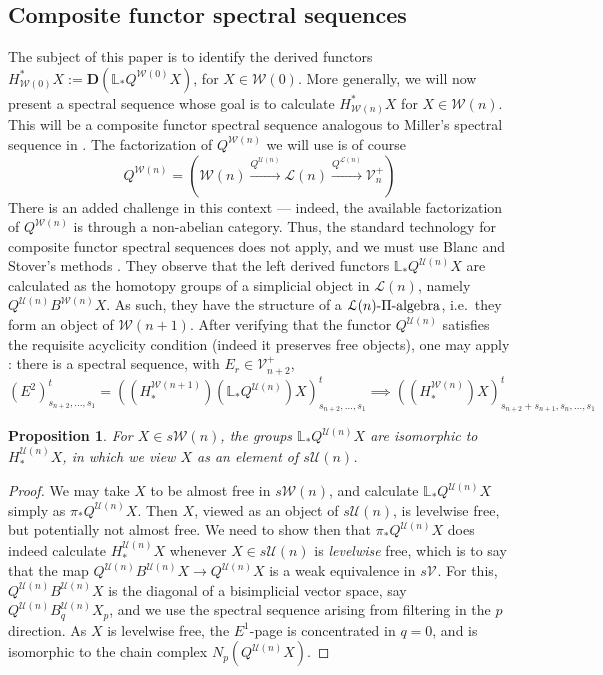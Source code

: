 \documentclass[11pt]{amsart}
\theoremstyle{plain}
\newtheorem{prop}[thm]{Proposition}
\theoremstyle{definition}
\renewcommand{\to}{\longrightarrow}
\newcommand{\calU}{\mathcal{U}}
\newcommand{\calL}{\mathcal{L}}
\newcommand{\calV}{\mathcal{V}}
\newcommand{\calw}{\mathcal{W}}
\theoremstyle{plain}
\newcommand{\vect}[2]{\calV^{#1}_{#2}}
\newcommand{\dual}{\mathbf{D}}
\begin{document}
\begin{Composite functor spectral sequences}

\section{\textbf{Composite functor spectral sequences}}
The subject of this paper is to identify the derived functors $H^*_{\calw(0)}X:=\dual(\mathbb{L}_*Q^{\calw(0)}X)$, for $X\in\calw(0)$. More generally, we will now present a spectral sequence whose goal is to calculate $H^*_{\calw(n)}X$ for $X\in\calw(n)$. This will be a composite functor spectral sequence analogous to Miller's spectral sequence in \cite{MillerSullivanConjecture.pdf}. The factorization of $Q^{\calw(n)}$ we will use is of course 
\[Q^{\calw(n)}=\left(\calw(n)\overset{Q^{\calU(n)}}{\to}\calL(n)\overset{Q^{\calL(n)}}{\to}\vect{+}{n}\right)\]
There is an added challenge in this context --- indeed, the available factorization of $Q^{\calw(n)}$ is through a non-abelian category. Thus, the standard technology for composite functor spectral sequences does not apply, and we must use Blanc and Stover's methods \cite{Blanc_Stover-Groth_SS.pdf}. They observe that the left derived functors $\mathbb{L}_*Q^{\calU(n)}X$ are calculated as the homotopy groups of a simplicial object in $\calL(n)$, namely $Q^{\calU(n)}B^{\calw(n)}X$. As such, they have the structure of a $\calL(n)\textup{-$\Pi$-algebra}$, i.e.\ they form an object of $\calw(n+1)$.  After verifying that the functor $Q^{\calU(n)}$ satisfies the requisite acyclicity condition (indeed it preserves free objects), one may apply \cite[Theorem 4.4]{Blanc_Stover-Groth_SS.pdf}: there is a spectral sequence, with $E_r\in\vect{+}{n+2}$,
\[(E^2)_{s_{n+2},\ldots,s_1}^t=((H_*^{\calw(n+1)})(\mathbb{L}_*Q^{\calU(n)})X)_{s_{n+2},\ldots,s_1}^t\implies ((H_*^{\calw(n)})X)_{s_{n+2}+s_{n+1},s_n,\ldots,s_1}^t\]
\begin{prop}
For $X\in s\calw(n)$, the groups $\mathbb{L}_*Q^{\calU(n)}X$ are isomorphic to $H_*^{\calU(n)}X$, in which we view $X$ as an element of $s\calU(n)$.
\end{prop}
\begin{proof}
We may take $X$ to be almost free in $s\calw(n)$, and calculate $\mathbb{L}_*Q^{\calU(n)}X$ simply as $\pi_*Q^{\calU(n)}X$. Then $X$, viewed as an object of $s\calU(n)$, is levelwise free, but potentially not almost free. We need to show then that $\pi_*Q^{\calU(n)}X$ does indeed calculate $H_*^{\calU(n)}X$ whenever $X\in s\calU(n)$ is \emph{levelwise} free, which is to say that the map $Q^{\calU(n)}B^{\calU(n)}X\to Q^{\calU(n)}X$ is a weak equivalence in $s\vect{}{}$. For this, $Q^{\calU(n)}B^{\calU(n)}X$ is the diagonal of a bisimplicial vector space, say $Q^{\calU(n)}B_q^{\calU(n)}X_p$, and we use the spectral sequence arising from filtering in the $p$ direction. As $X$ is levelwise free, the $E^1$-page is concentrated in $q=0$, and is isomorphic to the chain complex $N_p(Q^{\calU(n)}X)$.

\end{proof}
\end{Composite functor spectral sequences}
\end{document}
